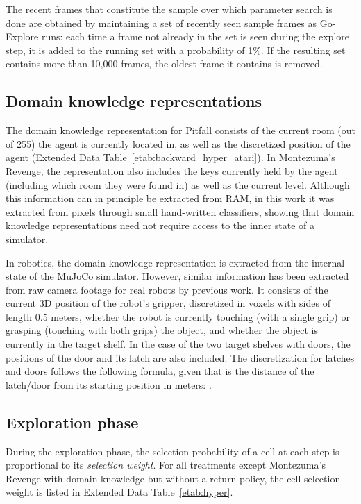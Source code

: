 \documentclass{nature}
\renewcommand*{\cite}[1]{\supercite{#1}}
\begin{document}
\begin{methods}
The recent frames that constitute the sample over which parameter search is done are obtained by maintaining a set of recently seen sample frames as Go-Explore runs: each time a frame not already in the set is seen during the explore step, it is added to the running set with a probability of 1\%. If the resulting set contains more than 10,000 frames, the oldest frame it contains is removed.

\subsection{Domain knowledge representations}

The domain knowledge representation for Pitfall consists of the current room (out of 255) the agent is currently located in, as well as the discretized  position of the agent (Extended Data Table~\ref{etab:backward_hyper_atari}). In Montezuma's Revenge, the representation also includes the keys currently held by the agent (including which room they were found in) as well as the current level. Although this information can in principle be extracted from RAM, in this work it was extracted from pixels through small hand-written classifiers, showing that domain knowledge representations need not require access to the inner state of a simulator.

In robotics, the domain knowledge representation is extracted from the internal state of the MuJoCo\cite{todorov2012mujoco} simulator. However, similar information has been extracted from raw camera footage for real robots by previous work\cite{andrychowicz2020learning}. It consists of the current 3D position of the robot's gripper, discretized in voxels with sides of length 0.5 meters, whether the robot is currently touching (with a single grip) or grasping (touching with both grips) the object, and whether the object is currently in the target shelf. In the case of the two target shelves with doors, the positions of the door and its latch are also included. The discretization for latches and doors follows the following formula, given that  is the distance of the latch/door from its starting position in meters: .

\subsection{Exploration phase}
\label{sec:exploration_phase}

During the exploration phase, the selection probability of a cell at each step is proportional to its \emph{selection weight}. For all treatments except Montezuma's Revenge with domain knowledge but without a return policy, the cell selection weight  is listed in Extended Data Table~\ref{etab:hyper}.


\end{methods}
\end{document}
